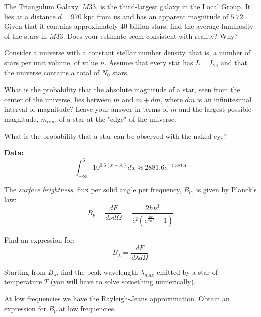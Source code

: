 \documentclass[11pt]{article}
\begin{document}
\begin{pproblem} The Triangulum Galaxy, \(M33\), is the third-largest galaxy in the Local Group. It lies at a distance \(d=970 \text{ kpc}\) from us and has an apparent magnitude of \(5.72\). Given that it contains approximately \(40\) billion stars, find the average luminosity of the stars in \(M33\). Does your estimate seem consistent with reality? Why?
\end{pproblem}

\begin{pproblem}
    Consider a universe with a constant stellar number density, that is, a number of stars per unit volume, of value \(n\). Assume that every star has \(L = L_\odot\) and that the universe contains a total of \(N_0\) stars.
    
    \begin{alternativas}
    \item What is the probability that the absolute magnitude of a star, seen from the center of the universe, lies between \(m\) and \(m+dm\), where \(dm\) is an infinitesimal interval of magnitude? Leave your answer in terms of \(m\) and the largest possible magnitude, \(m_{lim}\), of a star at the "edge" of the universe.

    \item What is the probability that a star can be observed with the naked eye?
    
    \textbf{Data:} \[\int_{-\infty}^{6}10^{0.6(x-A)}dx \approx 2881.6 e^{-1.381 A}\]
    \end{alternativas}
\end{pproblem}

\begin{pproblem}
    The \textit{surface brightness}, flux per solid angle per frequency, \(B_\nu\), is given by Planck's law:
    \[B_\nu = \frac{dF}{d\nu d\Omega} = \frac{2h\nu^3}{c^2(e^{\frac{h\nu}{k_BT}}-1)}\] 
    \begin{alternativas}
        \item Find an expression for:
        \[B_\lambda = \frac{dF}{d\lambda d\Omega}\]
        \item Starting from \(B_\lambda\), find the peak wavelength \(\lambda_{max}\) emitted by a star of temperature \(T\) (you will have to solve something numerically).
        \item At low frequencies we have the Rayleigh-Jeans approximation. Obtain an expression for \(B_\nu\) at low frequencies.
        \end{alternativas}


\end{pproblem}
\end{document}
